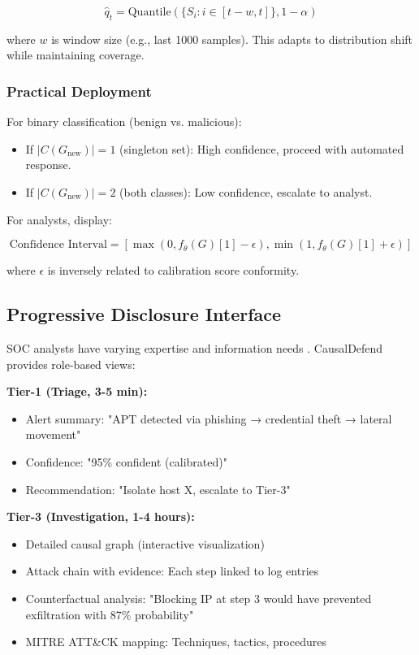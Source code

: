 \documentclass[conference]{IEEEtran}
\begin{document}
\begin{equation}
\hat{q}_t = \text{Quantile}\left( \{S_i : i \in [t-w, t]\}, 1-\alpha \right)
\end{equation}

where $w$ is window size (e.g., last 1000 samples). This adapts to distribution shift while maintaining coverage.

\subsubsection{Practical Deployment}

For binary classification (benign vs. malicious):

\begin{itemize}
    \item If $|C(G_{\text{new}})| = 1$ (singleton set): High confidence, proceed with automated response.
    \item If $|C(G_{\text{new}})| = 2$ (both classes): Low confidence, escalate to analyst.
\end{itemize}

For analysts, display:

\begin{equation}
\text{Confidence Interval} = \left[ \max(0, f_\theta(G)[1] - \epsilon), \min(1, f_\theta(G)[1] + \epsilon) \right]
\end{equation}

where $\epsilon$ is inversely related to calibration score conformity.

\subsection{Progressive Disclosure Interface}

SOC analysts have varying expertise and information needs \cite{analyst_study}. CausalDefend provides role-based views:

\textbf{Tier-1 (Triage, 3-5 min):}
\begin{itemize}
    \item Alert summary: "APT detected via phishing → credential theft → lateral movement"
    \item Confidence: "95\% confident (calibrated)"
    \item Recommendation: "Isolate host X, escalate to Tier-3"
\end{itemize}

\textbf{Tier-3 (Investigation, 1-4 hours):}
\begin{itemize}
    \item Detailed causal graph (interactive visualization)
    \item Attack chain with evidence: Each step linked to log entries
    \item Counterfactual analysis: "Blocking IP at step 3 would have prevented exfiltration with 87\% probability"
    \item MITRE ATT\&CK mapping: Techniques, tactics, procedures
\end{itemize}
\end{document}
